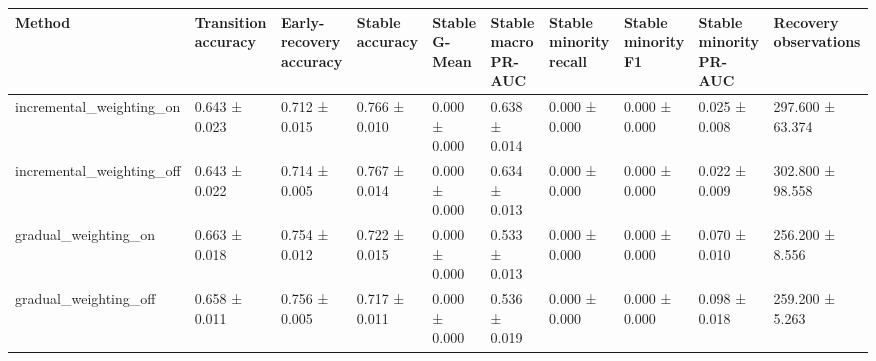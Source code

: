 \begin{tabular}{llllllllll}
\toprule
Method & Transition accuracy & Early-recovery accuracy & Stable accuracy & Stable G-Mean & Stable macro PR-AUC & Stable minority recall & Stable minority F1 & Stable minority PR-AUC & Recovery observations \\
\midrule
incremental\_weighting\_on & 0.643 ± 0.023 & 0.712 ± 0.015 & 0.766 ± 0.010 & 0.000 ± 0.000 & 0.638 ± 0.014 & 0.000 ± 0.000 & 0.000 ± 0.000 & 0.025 ± 0.008 & 297.600 ± 63.374 \\
incremental\_weighting\_off & 0.643 ± 0.022 & 0.714 ± 0.005 & 0.767 ± 0.014 & 0.000 ± 0.000 & 0.634 ± 0.013 & 0.000 ± 0.000 & 0.000 ± 0.000 & 0.022 ± 0.009 & 302.800 ± 98.558 \\
gradual\_weighting\_on & 0.663 ± 0.018 & 0.754 ± 0.012 & 0.722 ± 0.015 & 0.000 ± 0.000 & 0.533 ± 0.013 & 0.000 ± 0.000 & 0.000 ± 0.000 & 0.070 ± 0.010 & 256.200 ± 8.556 \\
gradual\_weighting\_off & 0.658 ± 0.011 & 0.756 ± 0.005 & 0.717 ± 0.011 & 0.000 ± 0.000 & 0.536 ± 0.019 & 0.000 ± 0.000 & 0.000 ± 0.000 & 0.098 ± 0.018 & 259.200 ± 5.263 \\
\bottomrule
\end{tabular}
